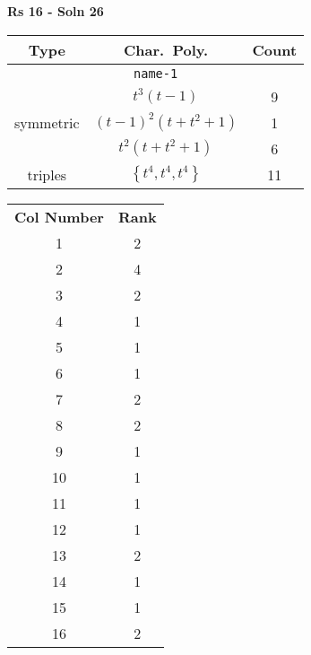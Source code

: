 \documentclass{article}
\begin{document}
    \textbf{Rs 16 - Soln 26}
    \begin{table}
    \begin{tabular}{|c|c|c|}
    \hline
    \textbf{Type} & \textbf{Char.~Poly.} & \textbf{Count} \\
    \hline \multicolumn{3}{|c|}{\texttt{name-1}} \\ \hline
    \multirow{3}{*}{symmetric}
    & $t^3(t - 1)$ & 9 \\
    & $(t - 1)^2(t + t^2 + 1)$ & 1 \\
    & $t^2(t + t^2 + 1)$ & 6 \\
    \hline
    \multirow{1}{*}{triples}
    & $\left\{t^4,t^4,t^4\right\}$ & 11 \\
    \hline
    \end{tabular}
    \end{table}
    \begin{table}
    \begin{tabular}{|c|c|}
    \hline
    \textbf{Col Number} & \textbf{Rank}\\
    1 & 2 \\ 
    2 & 4 \\ 
    3 & 2 \\ 
    4 & 1 \\ 
    5 & 1 \\ 
    6 & 1 \\ 
    7 & 2 \\ 
    8 & 2 \\ 
    9 & 1 \\ 
    10 & 1 \\ 
    11 & 1 \\ 
    12 & 1 \\ 
    13 & 2 \\ 
    14 & 1 \\ 
    15 & 1 \\ 
    16 & 2 \\ 
    \hline
    \end{tabular}
    \end{table}
    \newpage
\end{document}
